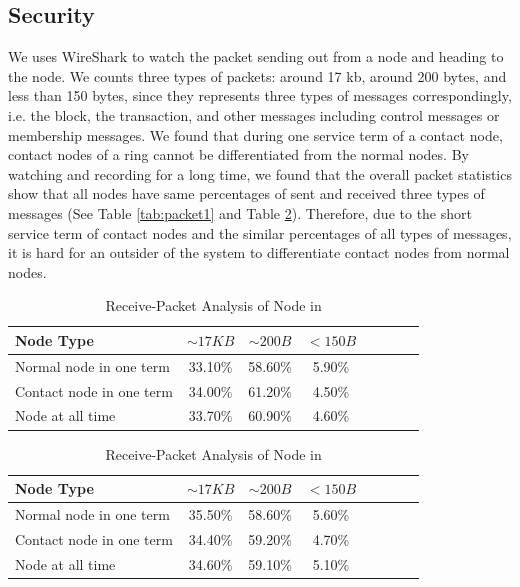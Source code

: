 \subsection{Security}

We uses WireShark \cite{chappell2010wireshark} to watch the packet sending out from a node and heading to the node. We counts three types of packets: around 17 kb, around 200 bytes, and less than 150 bytes, since they represents three types of messages correspondingly, i.e. the block, the transaction, and other messages including control messages or membership messages. We found that during one service term of a contact node, contact nodes of a ring cannot be differentiated from the normal nodes. By watching and recording for a long time, we found that the overall packet statistics show that all nodes have same percentages of sent and received three types of messages (See Table \ref{tab:packet1} and Table \ref{tab:packet2}). Therefore, due to the short service term of contact nodes and the similar percentages of all types of messages, it is hard for an outsider of the system to differentiate contact nodes from normal nodes.

\begin{table}
	\begin{tabular}{l*{6}{c}r}
		Node Type & $\sim17 KB$ & $\sim200 B$ & $<150 B$ \\
		\hline		
		Normal node in one term & 33.10\%	& 58.60\% & 5.90\% \\
		Contact node in one term & 34.00\%	& 61.20\% &4.50\%  \\
		Node at all time  & 33.70\%	& 60.90\% &4.60\%  \\
	\end{tabular}
	\caption{Send-Packet Analysis of Node in \xxx}
	\label{tab:packet1}
	\vspace{2mm}
	\begin{tabular}{l*{6}{c}r}
		Node Type & $\sim17 KB$ & $\sim200 B$ & $<150 B$ \\
		\hline		
		Normal node in one term & 35.50\% & 58.60\% & 5.60\% \\
		Contact node in one term & 34.40\% & 59.20\% & 4.70\%  \\
		Node at all time  & 34.60\% & 59.10\% & 5.10\%  \\
	\end{tabular}
	\caption{Receive-Packet Analysis of Node in \xxx}
	\label{tab:packet2}
\end{table}